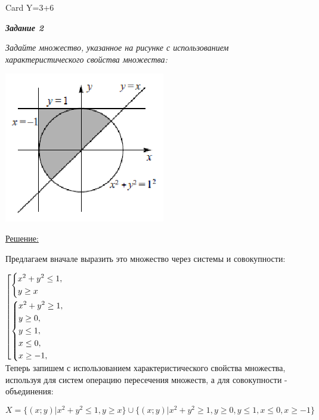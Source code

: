 \documentclass[11pt]{article}
\begin{document}
Card Y=3+6

\pagebreak

\textit{\textbf{Задание 2}}

\textit{Задайте множество, указанное на рисунке с использованием
характеристического свойства множества:}

\includegraphics{task2}

\underline{Решение:}

Предлагаем вначале выразить это множество через системы и
совокупности:

$\left[ 
  \begin{gathered} 
    \left\{ 
      \begin{gathered} 
		  x^2 + y^2 \leq 1, \hfill 
        \\ 
        y \geq x \hfill 
        \\ 
      \end{gathered} 
    \right. \hfill 
    \\ 
    \left\{ 
      \begin{gathered} 
		  x^2+y^2 \geq 1, \hfill 
        \\ 
        y \geq 0, \hfill 
        \\ 
        y \leq 1, \hfill 
        \\ 
        x \leq 0, \hfill 
        \\ 
        x \geq -1, \hfill 
        \\ 
      \end{gathered} 
    \right. \hfill 
    \\ 
  \end{gathered} 
\right.$
\\[3pt]

Теперь запишем с использованием характеристического
свойства множества, используя для систем операцию пересечения
множеств, а для совокупности - объединения:

$$X=\{(x;y) \vert x^2+y^2 \leq 1, y \geq x\} \cup \{(x;y)\vert
x^2 + y^2 \geq 1, y \geq 0, y \leq 1, x \leq 0, x \geq -1\}$$
\end{document}
